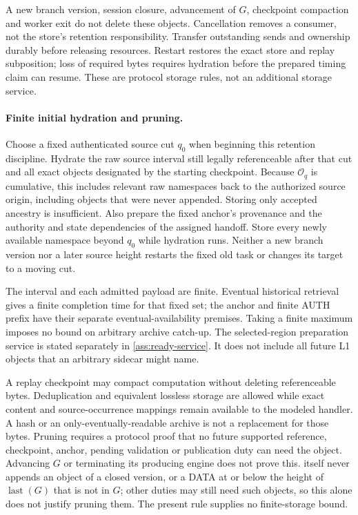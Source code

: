 \documentclass[11pt,a4paper]{article}
\newcounter{protocol}
\begin{document}
A new branch version, session closure, advancement of $G$, checkpoint
compaction and worker exit do not delete these objects. Cancellation
removes a consumer, not the store's retention responsibility. Transfer
outstanding sends and ownership durably before releasing resources.
Restart restores the exact store and replay subposition; loss of required
bytes requires hydration before the prepared timing claim can resume.
These are protocol storage rules, not an additional storage service.

\paragraph{Finite initial hydration and pruning.}
\label{sec:source-hydration}
Choose a fixed authenticated source cut $q_0$ when beginning this
retention discipline. Hydrate the raw source interval still legally
referenceable after that cut and all exact objects designated by the
starting checkpoint. Because $\mathcal O_q$ is cumulative, this
includes relevant raw namespaces back to the authorized source origin,
including objects that were never appended. Storing only accepted
ancestry is insufficient. Also prepare the fixed anchor's provenance and the
authority and state dependencies of the assigned handoff.
Store every newly available namespace beyond $q_0$ while hydration
runs. Neither a new branch version nor a later source height restarts the fixed
old task or changes its target to a moving cut.

The interval and each admitted payload are finite. Eventual historical
retrieval gives a finite completion time for that fixed set; the anchor
and finite AUTH prefix have their separate eventual-availability
premises. Taking a finite maximum imposes no bound on arbitrary archive catch-up.
The selected-region preparation service is stated separately in
\cref{ass:ready-service}. It does not include all future
L1 objects that an arbitrary sidecar might name.

A replay checkpoint may compact computation without deleting
referenceable bytes. Deduplication and equivalent lossless storage are
allowed while exact content and source-occurrence mappings remain
available to the modeled handler. A hash or an only-eventually-readable
archive is not a replacement for those bytes. Pruning requires a
protocol proof that no future supported reference, checkpoint,
anchor, pending validation or publication duty can need the object.
Advancing $G$ or terminating its producing engine does not prove this.
 itself never appends an object of a closed
version, or a DATA at or below the height of $\operatorname{last}(G)$
that is not in $G$; other duties may still need such objects, so this
alone does not justify pruning them.
The present rule supplies no finite-storage bound.
\end{document}
